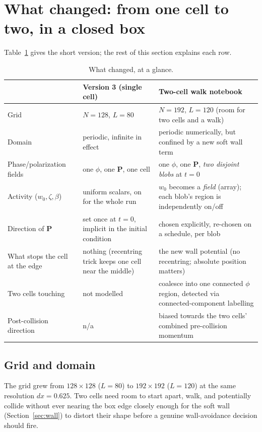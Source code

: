 \documentclass[11pt]{article}
\newcommand{\bP}{\mathbf{P}}
\begin{document}
\section{What changed: from one cell to two, in a closed box}
\label{sec:changes}

Table~\ref{tab:changes} gives the short version; the rest of this
section explains each row.

\begin{table}[h]
\centering
\small
\begin{tabular}{@{}p{3.6cm}p{5.6cm}p{5.6cm}@{}}
\hline
& \textbf{Version 3 (single cell)} & \textbf{Two-cell walk notebook} \\
\hline
Grid & $N{=}128$, $L{=}80$ & $N{=}192$, $L{=}120$ (room for two cells and a walk) \\
Domain & periodic, infinite in effect & periodic numerically, but confined by a new soft wall term \\
Phase/polarization fields & one $\phi$, one $\bP$, one cell & one $\phi$, one $\bP$, \emph{two disjoint blobs} at $t{=}0$ \\
Activity ($w_0,\zeta,\beta$) & uniform scalars, on for the whole run & $w_0$ becomes a \emph{field} (array); each blob's region is independently on/off \\
Direction of $\bP$ & set once at $t{=}0$, implicit in the initial condition & chosen explicitly, re-chosen on a schedule, per blob \\
What stops the cell at the edge & nothing (recentring trick keeps one cell near the middle) & the new wall potential (no recentring; absolute position matters) \\
Two cells touching & not modelled & coalesce into one connected $\phi$ region, detected via connected-component labelling \\
Post-collision direction & n/a & biased towards the two cells' combined pre-collision momentum \\
\hline
\end{tabular}
\caption{What changed, at a glance.}
\label{tab:changes}
\end{table}

\subsection{Grid and domain}
The grid grew from $128\times128$ ($L=80$) to $192\times192$
($L=120$) at the same resolution $dx=0.625$. Two cells need room to
start apart, walk, and potentially collide without ever nearing the
box edge closely enough for the soft wall (Section~\ref{sec:wall}) to
distort their shape before a genuine wall-avoidance decision should
fire.
\end{document}
